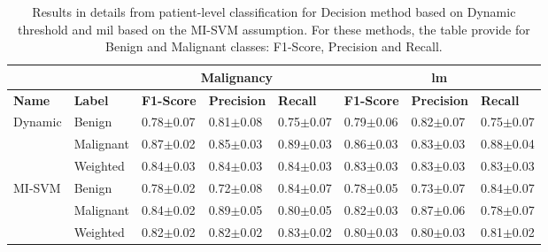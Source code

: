 \documentclass[journal,article,submit,moreauthors,pdftex, applsci]{Definitions/mdpi}
\begin{document}
\begin{table}[h]
    \centering
    \begin{tabular}{lllll|lll}
                                &                   & \multicolumn{3}{c}{\textbf{Malignancy}}                               & \multicolumn{3}{c}{\textbf{\ac{lm}}}                                  \\ \hline
    \textbf{Name}               & \textbf{Label}    & \textbf{F1-Score}     & \textbf{Precision}    & \textbf{Recall}       & \textbf{F1-Score}     & \textbf{Precision}    & \textbf{Recall}       \\ \hline
    \multirow{3}{*}{Dynamic}    & Benign            & 0.78$\pm$0.07         & 0.81$\pm$0.08         & 0.75$\pm$0.07         & 0.79$\pm$0.06         & 0.82$\pm$0.07         & 0.75$\pm$0.07         \\ \cline{2-8}  
                                & Malignant         & 0.87$\pm$0.02         & 0.85$\pm$0.03         & 0.89$\pm$0.03         & 0.86$\pm$0.03         & 0.83$\pm$0.03         & 0.88$\pm$0.04         \\ \cline{2-8} 
                                & Weighted          & 0.84$\pm$0.03         & 0.84$\pm$0.03         & 0.84$\pm$0.03         & 0.83$\pm$0.03         & 0.83$\pm$0.03         & 0.83$\pm$0.03         \\ \hline
    \multirow{3}{*}{MI-SVM}     & Benign            & 0.78$\pm$0.02         & 0.72$\pm$0.08         & 0.84$\pm$0.07         & 0.78$\pm$0.05         & 0.73$\pm$0.07         & 0.84$\pm$0.07         \\ \cline{2-8}
                                & Malignant         & 0.84$\pm$0.02         & 0.89$\pm$0.05         & 0.80$\pm$0.05         & 0.82$\pm$0.03         & 0.87$\pm$0.06         & 0.78$\pm$0.07         \\ \cline{2-8} 
                                & Weighted          & 0.82$\pm$0.02         & 0.82$\pm$0.02         & 0.83$\pm$0.02         & 0.80$\pm$0.03         & 0.80$\pm$0.03         & 0.81$\pm$0.02         \\ \hline 
    \end{tabular}    
    \caption{Results in details from patient-level classification for Decision method based on Dynamic threshold and \ac{mil} based on the MI-SVM assumption. For these methods, the table provide for Benign and Malignant classes: F1-Score, Precision and Recall.}
    \label{tab:patient_results_details}
\end{table}\par
\end{document}
